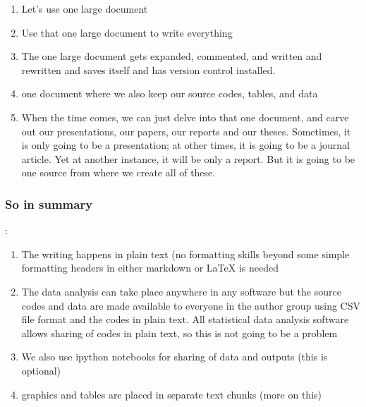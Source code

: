 \begin{enumerate}
\item Let's use one large document
\item Use that one large document to write everything
\item The one large document gets expanded, commented, and written and rewritten and saves itself and has version control installed.
\item one document where we also keep our source codes, tables, and data
\item When the time comes, we can just delve into that one document, and carve out our presentations, our papers, our reports and our theses. Sometimes, it is only going to be a presentation; at other times, it is going to be a journal article. Yet at another instance, it will be only a report. But it is going to be one source from where we create all of these. 
\end{enumerate}

\subsubsection{So in summary}:

\begin{enumerate}
\item The writing happens in plain text (no formatting skills beyond some simple formatting headers in either markdown or LaTeX is needed
\item The data analysis can take place anywhere in any software but the source codes and data are made available to everyone in the author group using CSV file format and the codes in plain text. All statistical data analysis software allows sharing of codes in plain text, so this is not going to be a problem
\item We also use ipython notebooks for sharing of data and outputs (this is optional)
\item graphics and tables are placed in separate text chunks (more on this)
\end{enumerate}


    
    
